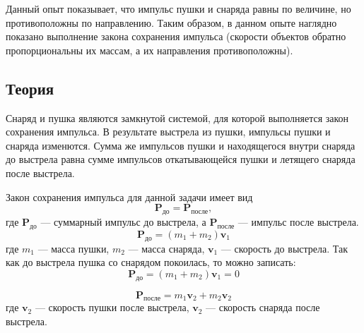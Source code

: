 \documentclass[All.tex]{subfiles}
\begin{document}
Данный опыт показывает, что импульс пушки и снаряда равны по величине, но противоположны по направлению.
Таким образом, в данном опыте наглядно показано выполнение закона сохранения импульса (скорости объектов обратно пропорциональны их массам, а их направления противоположны).

\subsection*{\textcolor{PineGreen}{Теория}}

Снаряд и пушка являются замкнутой системой, для которой выполняется закон сохранения импульса. 
В результате выстрела из пушки, импульсы пушки и снаряда изменются.
Сумма же импульсов пушки и находящегося внутри снаряда до выстрела равна сумме импульсов откатывающейся пушки и летящего снаряда после выстрела.

Закон сохранения импульса для данной задачи имеет вид 
\begin{equation}\label{cannon-eq1}
 \textbf{P}_{\text{до}} = \textbf{P}_{\text{после}},
\end{equation}
где $ \textbf{P}_{\text{до}} $ — суммарный импульс до выстрела, а $ \textbf{P}_{\text{после}} $ — импульс после выстрела. 
\begin{equation}\label{cannon-eq2}
\textbf{P}_{\text{до}} = (m_{1} + m_{2})\textbf{v}_{1}
\end{equation}
где $ m_{1} $ — масса пушки, $ m_{2} $ — масса снаряда, $ \textbf{v}_{1} $ — скорость до выстрела.
Так как до выстрела пушка со снарядом покоилась, то можно записать: 
\begin{equation}\label{cannon-eq3}
\textbf{P}_{\text{до}} = (m_{1} + m_{2})\textbf{v}_{1} = 0
\end{equation}

\begin{equation}\label{cannon-eq4}
\textbf{P}_{\text{после}} = m_{1}\textbf{v}_{2} + m_{2}\textbf{v}_{2} 
\end{equation}
где $ \textbf{v}_{2} $ — скорость пушки после выстрела, $ \textbf{v}_{2} $ — скорость снаряда после выстрела.
\end{document}
